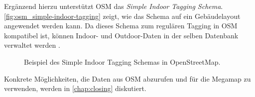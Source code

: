 Ergänzend hierzu unterstützt OSM das \emph{Simple Indoor Tagging Schema}.
\autoref{fig:osm_simple-indoor-tagging} zeigt, wie das Schema auf ein Gebäudelayout angewendet werden kann.
Da dieses Schema zum regulären Tagging in OSM kompatibel ist, können Indoor- und Outdoor-Daten in der selben Datenbank verwaltet werden \parencite{OpenStreetMapFoundation2018c}.
\begin{figure}[t]
    \centering
    \caption{Beispiel des Simple Indoor Tagging Schemas in OpenStreetMap. %
    }
    \label{fig:osm_simple-indoor-tagging}
\end{figure}

Konkrete Möglichkeiten, die Daten aus OSM abzurufen und für die Megamap zu verwenden, werden in \autoref{chap:closing} diskutiert.
%
\cleardoublepage
